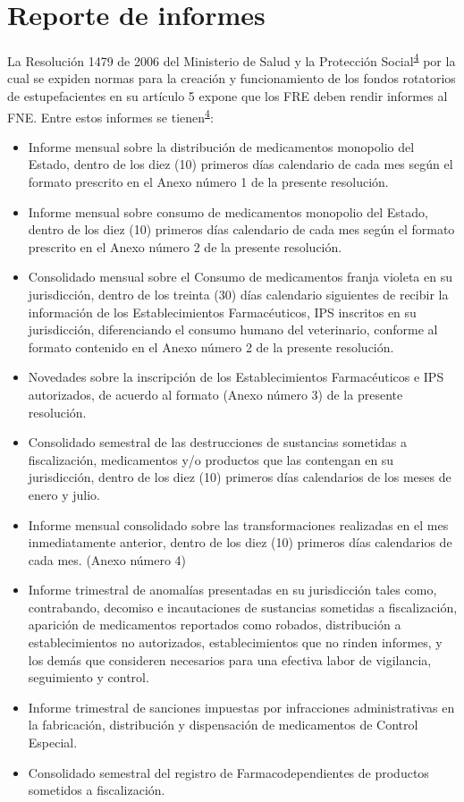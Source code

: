 \documentclass[
]{book}
\begin{document}
\hypertarget{reporte-de-informes}{%
\chapter{Reporte de informes}\label{reporte-de-informes}}


La Resolución 1479 de 2006 del Ministerio de Salud y la Protección Social\textsuperscript{\protect\hyperlink{ref-MSPS1479-2006}{4}} por la cual se expiden normas para la creación y funcionamiento de los fondos rotatorios de estupefacientes en su artículo 5 expone que los FRE deben rendir informes al FNE. Entre estos informes se tienen\textsuperscript{\protect\hyperlink{ref-MSPS1479-2006}{4}}:

\begin{itemize}
\item
  Informe mensual sobre la distribución de medicamentos monopolio del Estado, dentro de los diez (10) primeros días calendario de cada mes según el formato prescrito en el Anexo número 1 de la presente resolución.
\item
  Informe mensual sobre consumo de medicamentos monopolio del Estado, dentro de los diez (10) primeros días calendario de cada mes según el formato prescrito en el Anexo número 2 de la presente resolución.
\item
  Consolidado mensual sobre el Consumo de medicamentos franja violeta en su jurisdicción, dentro de los treinta (30) días calendario siguientes de recibir la información de los Establecimientos Farmacéuticos, IPS inscritos en su jurisdicción, diferenciando el consumo humano del veterinario, conforme al formato contenido en el Anexo número 2 de la presente resolución.
\item
  Novedades sobre la inscripción de los Establecimientos Farmacéuticos e IPS autorizados, de acuerdo al formato (Anexo número 3) de la presente resolución.
\item
  Consolidado semestral de las destrucciones de sustancias sometidas a fiscalización, medicamentos y/o productos que las contengan en su jurisdicción, dentro de los diez (10) primeros días calendarios de los meses de enero y julio.
\item
  Informe mensual consolidado sobre las transformaciones realizadas en el mes inmediatamente anterior, dentro de los diez (10) primeros días calendarios de cada mes. (Anexo número 4)
\item
  Informe trimestral de anomalías presentadas en su jurisdicción tales como, contrabando, decomiso e incautaciones de sustancias sometidas a fiscalización, aparición de medicamentos reportados como robados, distribución a establecimientos no autorizados, establecimientos que no rinden informes, y los demás que consideren necesarios para una efectiva labor de vigilancia, seguimiento y control.
\item
  Informe trimestral de sanciones impuestas por infracciones administrativas en la fabricación, distribución y dispensación de medicamentos de Control Especial.
\item
  Consolidado semestral del registro de Farmacodependientes de productos sometidos a fiscalización.
\end{itemize}
\end{document}
